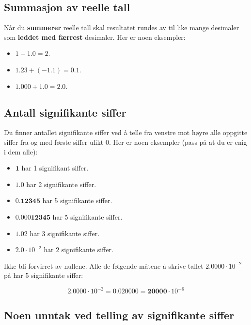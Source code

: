 \documentclass[a4paper,9pt]{article}
\begin{document}
\subsection{Summasjon av reelle tall}

Når du \textbf{summerer} reelle tall skal resultatet rundes av til like mange desimaler som\textbf{ leddet med færrest} desimaler. Her er noen eksempler:

\begin{itemize}
\item $1 + 1.0 = 2$.
\item $1.23 + (- 1.1) = 0.1$.
\item $1.000 + 1.0 = 2.0$. 
\end{itemize}



\subsection{Antall signifikante siffer}

Du finner antallet signifikante siffer ved å telle fra venstre mot høyre alle oppgitte siffer fra og med første siffer ulikt 0. Her er noen eksempler (pass på at du er enig i dem alle):

\begin{itemize}
\item $\mathbf{1}$ har 1 signifikant siffer.
\item $\mathbf{1.0}$ har 2 signifikante siffer. 
\item $0.\mathbf{12345}$ har 5 signifikante siffer. 
\item $0.000\mathbf{12345}$ har 5 signifikante siffer. 
\item $\mathbf{1.02}$ har 3 signifikante siffer. 
\item $\mathbf{2.0}\cdot10^{-2}$ har 2 signifikante siffer. 
\end{itemize}

Ikke bli forvirret av nullene. Alle de følgende måtene å skrive tallet $\mathbf{2.0000}\cdot10^{-2}$ på har 5 signifikante siffer:

\begin{equation}
\mathbf{2.0000}\cdot10^{-2} = 0.020000 = \mathbf{20000}\cdot10^{-6} 
\end{equation}

\subsection{Noen unntak ved telling av signifikante siffer}
\end{document}
